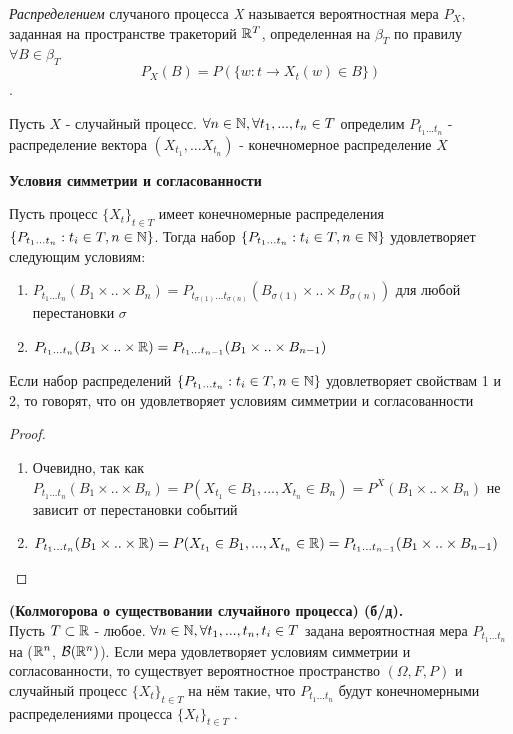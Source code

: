 \begin{definition}\textit{Распределением} случаного процесса \textit{X} называется вероятностная мера $P_{X}$, заданная на пространстве тракеторий $\mathbb{R}^T$, определенная на $\beta_{T}$
по правилу $\forall B \in \beta_{T}$ $$ P_{X}(B) = P(\{w : t \rightarrow X_{t}(w) \in B \})$$ .
\end{definition}

\begin{definition}
Пусть $X$ - случайный процесс. $\forall n \in \mathbb{N}, \forall t_1, ..., t_n \in T$ определим $P_{t_1...t_n}$ - распределение вектора $(X_{t_1}, ... X_{t_n})$ - конечномерное распределение $X$ 
\end{definition}
\textbf{Условия симметрии и согласованности}
\begin{lemma}
Пусть процесс $\{X_t\}_{t \in T}$ имеет конечномерные распределения $\{P_{t_1...t_n}: t_i \in T, n\in \mathbb{N}\}$. Тогда набор $\{P_{t_1...t_n}: t_i \in T, n\in \mathbb{N}\}$ удовлетворяет следующим условиям: \begin{enumerate}
    \item $P_{t_1...t_n}(B_1 \times .. \times B_n) = P_{t_{\sigma(1)}...t_{\sigma(n)}}(B_{\sigma(1)} \times .. \times B_{\sigma(n)})$ для любой перестановки $\sigma$ 
    \item  $P_{t_1...t_n}(B_1 \times .. \times \mathbb{R}) = P_{t_1...t_{n-1}}(B_1 \times .. \times B_{n-1})$
\end{enumerate}
\begin{note}
    Если набор распределений $\{P_{t_1...t_n}: t_i \in T, n\in \mathbb{N}\}$ удовлетворяет свойствам 1 и 2, то говорят, что он удовлетворяет условиям симметрии и согласованности
\end{note}
\end{lemma}
\begin{proof}
\begin{enumerate}
    \item Очевидно, так как $P_{t_1...t_n}(B_1 \times .. \times B_n) = P(X_{t_1} \in B_1, ..., X_{t_n} \in B_n) = P^{X}(B_1 \times .. \times B_n)$ 
не зависит от перестановки событий
\item $P_{t_1...t_n}(B_1 \times .. \times \mathbb{R}) = P(X_{t_1} \in B_1, ..., X_{t_n} \in \mathbb{R}) = P_{t_1...t_{n-1}}(B_1 \times .. \times B_{n-1})$ 
\end{enumerate}
\end{proof}
\begin{theorem} \textbf{(Колмогорова о существовании случайного процесса) (б/д).} \\
Пусть $T \subset \mathbb{R}$ - любое.  $ \forall n \in \mathbb{N}, \forall t_1, ...,  t_n, t_i \in T $ задана вероятностная мера $P_{t_1...t_n}$ на ($\mathbb{R}^n$, $\mathcal{B}(\mathbb{R}^n)$).
Если мера удовлетворяет условиям симметрии и согласованности, то существует вероятностное пространство $(\Omega, F, P)$ и случайный процесс $\{X_t\}_{t \in T}$ на нём такие, что  $P_{t_1...t_n}$ будут конечномерными распределениями процесса $\{X_t\}_{t \in T}$ .
\end{theorem}

